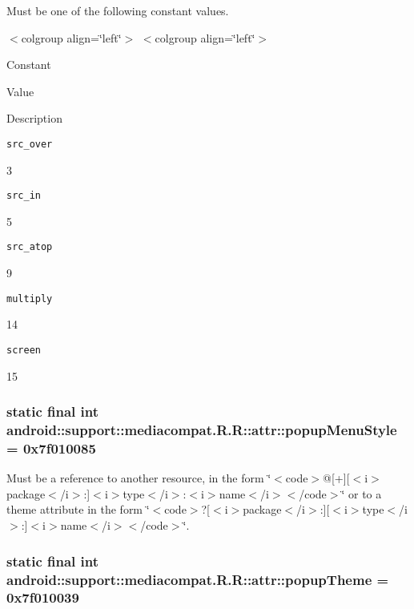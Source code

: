 Must be one of the following constant values. \begin{TabularC}{0}
\hline
\end{TabularC}
$<$colgroup align=\char`\"{}left\char`\"{}$>$ $<$colgroup align=\char`\"{}left\char`\"{}$>$ 

Constant

Value

Description 

{\tt src\_\-over}

3

{\tt src\_\-in}

5

{\tt src\_\-atop}

9

{\tt multiply}

14

{\tt screen}

15\hypertarget{classandroid_1_1support_1_1mediacompat_1_1_r_1_1attr_7bd4bdd9aada89cca50f227207b99c02}{
\subsubsection[{popupMenuStyle}]{\setlength{\rightskip}{0pt plus 5cm}static final int android::support::mediacompat.R.R::attr::popupMenuStyle = 0x7f010085}}
\label{classandroid_1_1support_1_1mediacompat_1_1_r_1_1attr_7bd4bdd9aada89cca50f227207b99c02}


Must be a reference to another resource, in the form \char`\"{}$<$code$>$@\mbox{[}+\mbox{]}\mbox{[}$<$i$>$package$<$/i$>$:\mbox{]}$<$i$>$type$<$/i$>$:$<$i$>$name$<$/i$>$$<$/code$>$\char`\"{} or to a theme attribute in the form \char`\"{}$<$code$>$?\mbox{[}$<$i$>$package$<$/i$>$:\mbox{]}\mbox{[}$<$i$>$type$<$/i$>$:\mbox{]}$<$i$>$name$<$/i$>$$<$/code$>$\char`\"{}. \hypertarget{classandroid_1_1support_1_1mediacompat_1_1_r_1_1attr_c3edefcbf0340d07a2913a610e73900e}{
\subsubsection[{popupTheme}]{\setlength{\rightskip}{0pt plus 5cm}static final int android::support::mediacompat.R.R::attr::popupTheme = 0x7f010039}}
\label{classandroid_1_1support_1_1mediacompat_1_1_r_1_1attr_c3edefcbf0340d07a2913a610e73900e}


